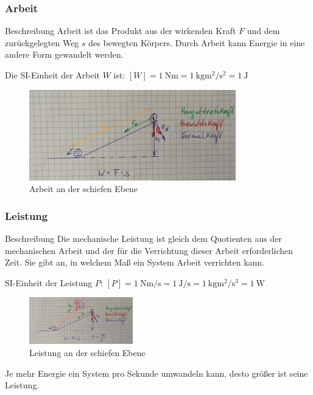 \documentclass{article}
\begin{document}
\frame
{
  \frametitle{Arbeit}
\begin{block}{Beschreibung}
Arbeit ist das Produkt aus der wirkenden Kraft $F$ und dem zurückgelegten Weg $s$ des bewegten Körpers. Durch Arbeit kann Energie in eine andere Form gewandelt werden.
\end{block}
Die SI-Einheit der Arbeit $W$ ist:
$[W]=\SI{1}{\newton\meter}=\SI{1}{\kilo\gram\square\meter\per\square\second}=\SI{1}{\joule}$
      \begin{figure}
	  \includegraphics[width=0.8\textwidth]{Arbeit_1}
	  \vspace{-3mm}
	  \caption{Arbeit an der schiefen Ebene}
   \end{figure}
}

\frame
{
  \frametitle{Leistung}
\begin{block}{Beschreibung}
Die mechanische Leistung ist gleich dem Quotienten aus der mechanischen Arbeit und der für die Verrichtung dieser Arbeit erforderlichen Zeit. Sie gibt an, in welchem Maß ein System Arbeit verrichten kann.
\end{block}
SI-Einheit der Leistung $P$:
$[P]=\SI{1}{\newton\meter\per\second}=\SI{1}{\joule\per\second}=\SI{1}{\kilo\gram\square\meter\per\cubic\second}=\SI{1}{\watt}$
      \begin{figure}
	  \includegraphics[width=0.4\textwidth]{Leistung}
	  \vspace{-3mm}
	  \caption{Leistung an der schiefen Ebene}
   \end{figure}
   Je mehr Energie ein System pro Sekunde umwandeln kann, desto größer ist seine Leistung.
}
\end{document}

